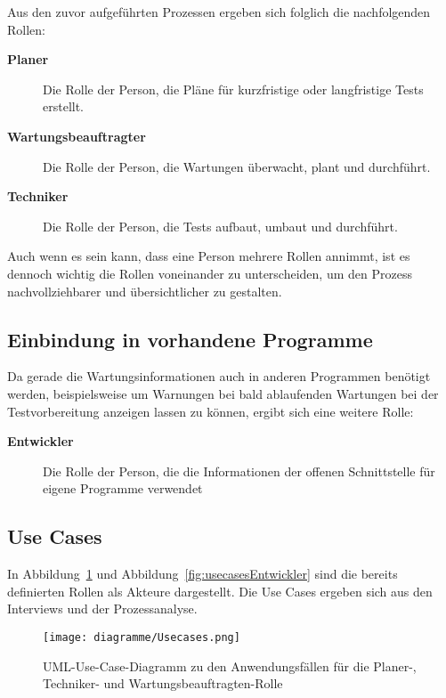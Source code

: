 Aus den zuvor aufgeführten Prozessen ergeben sich folglich die nachfolgenden Rollen:

\begin{description}
    \item[\textbf{Planer}] Die Rolle der Person, die Pläne für kurzfristige oder
    langfristige Tests erstellt.

    \item[\textbf{Wartungsbeauftragter}] Die Rolle der Person, die Wartungen 
    überwacht, plant und durchführt. 

    \item[\textbf{Techniker}] Die Rolle der Person, die Tests aufbaut, umbaut und
    durchführt.
\end{description}

Auch wenn es sein kann, dass eine Person mehrere Rollen annimmt, ist es dennoch 
wichtig die Rollen voneinander zu unterscheiden, um den Prozess nachvollziehbarer
und übersichtlicher zu gestalten.

\subsection{Einbindung in vorhandene Programme}
Da gerade die Wartungsinformationen auch in anderen Programmen benötigt werden, 
beispielsweise um Warnungen bei bald ablaufenden Wartungen bei der Testvorbereitung
anzeigen lassen zu können, ergibt sich eine weitere Rolle:

\begin{description}
    \item[\textbf{Entwickler}] Die Rolle der Person, die die Informationen der
    offenen Schnittstelle für eigene Programme verwendet
\end{description}

\subsection{Use Cases}\label{sec:usecases}
In Abbildung~\ref{fig:usecases} und Abbildung~\ref{fig:usecasesEntwickler} sind 
die bereits definierten Rollen als Akteure dargestellt.
Die Use Cases ergeben sich aus den Interviews und der Prozessanalyse.

\begin{figure}[H]
    \texttt{[image: diagramme/Usecases.png]}
    \caption{UML-Use-Case-Diagramm zu den Anwendungsfällen für die Planer-, Techniker- und Wartungsbeauftragten-Rolle}\label{fig:usecases}
\end{figure}

